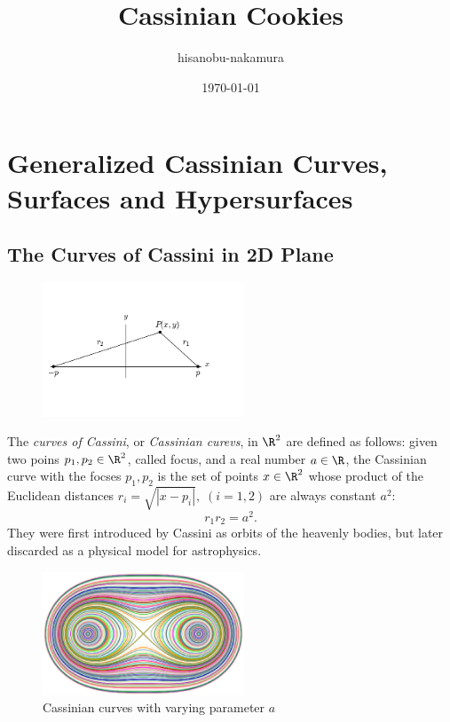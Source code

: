 \documentclass{article}
\author{hisanobu-nakamura}
\date{\today}
\title{Cassinian Cookies}
\begin{document}
\maketitle
\tableofcontents


\section{Generalized Cassinian Curves, Surfaces and Hypersurfaces}
\label{sec:orgad45072}
\subsection{The Curves of Cassini in 2D Plane}
\label{sec:orgb521fc3}
\begin{figure}[h]
\begin{center}
\includegraphics[width=6cm]{images/cassini_generic_point.png}
\caption{}
\label{ }
\end{center}
\end{figure}
The \emph{curves of Cassini}, or \emph{Cassinian curevs}, in \(\R^2\) are defined as follows: given two poins \(p_1, p_2 \in \R^2\), called focus, and a real number \(a \in \R\), 
the Cassinian curve with the focses \(p_{1},p_{2}\) is the set of points \(x \in \R^2\) whose product of the Euclidean distances \(r_i = \sqrt{|x-p_i|}, \; (i=1,2)\) are always constant \(a^2\):
\begin{equation}
\label{ }
r_1 r_2 = a^2.
\end{equation}
They were first introduced by Cassini as orbits of the heavenly bodies, but later discarded as a physical model for astrophysics.
\begin{figure}[h]
\begin{center}
\includegraphics[width=6cm]{images/cassini2.eps}
\caption{Cassinian curves with varying parameter $a$}
\label{ }
\end{center}
\end{figure}
\end{document}

